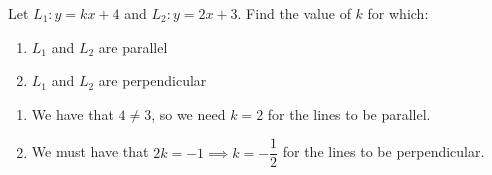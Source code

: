 \documentclass[12pt, a4paper, titlepage, twoside]{article}
\newcounter{excount}[subsection]
\begin{document}
	\hfill	
	
	\begin{ex}
		Let $L_1: y = kx + 4$ and $L_2: y = 2x + 3$. Find the value of $k$ for which:
		
		\begin{enumerate}[label=\textbf{(\alph*)}]
			\item $L_1$ and $L_2$ are parallel
			\item $L_1$ and $L_2$ are perpendicular
		\end{enumerate}
		
		\tcbline
		\hfill
		
		\begin{enumerate}[label=\textbf{(\alph*)}]
			\item We have that $4 \neq 3$, so we need $k = 2$ for the lines to be parallel.
			\item We must have that $2k = -1 \implies k = -\dfrac{1}{2}$ for the lines to be perpendicular.
		\end{enumerate}
	\end{ex}	
	
	\newpage
	
\end{document}
